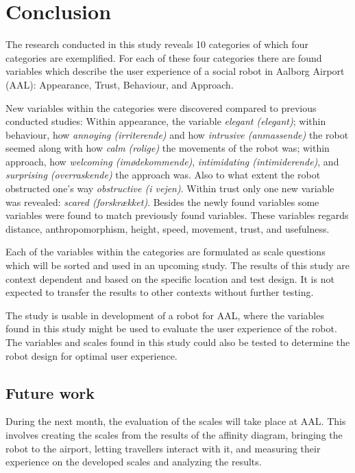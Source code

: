 \section{Conclusion}
\label{Conclusion}
%
The research conducted in this study reveals 10 categories of which four categories are exemplified. For each of these four categories there are found variables which describe the user experience of a social robot in Aalborg Airport (AAL): Appearance, Trust, Behaviour, and Approach.

New variables within the categories were discovered compared to previous conducted studies: Within appearance, the variable \textit{elegant (elegant)}; within behaviour, how \textit{annoying (irriterende)} and how \textit{intrusive (anmassende)} the robot seemed along with how \textit{calm (rolige)} the movements of the robot was; within approach, how \textit{welcoming (imødekommende)}, \textit{intimidating (intimiderende)}, and \textit{surprising (overraskende)} the approach was. Also to what extent the robot obstructed one's way \textit{obstructive (i vejen)}. Within trust only one new variable was revealed: \textit{scared (forskrækket)}. Besides the newly found variables some variables were found to match previously found variables. These variables regards distance, anthropomorphism, height, speed, movement, trust, and usefulness.

Each of the variables within the categories are formulated as scale questions which will be sorted and used in an upcoming study. The results of this study are context dependent and based on the specific location and test design. It is not expected to transfer the results to other contexts without further testing. 

The study is usable in development of a robot for AAL, where the variables found in this study might be used to evaluate the user experience of the robot. The variables and scales found in this study could also be tested to determine the robot design for optimal user experience.

\subsection{Future work}
During the next month, the evaluation of the scales will take place at AAL. This involves creating the scales from the results of the affinity diagram, bringing the robot to the airport, letting travellers interact with it, and measuring their experience on the developed scales and analyzing the results.

